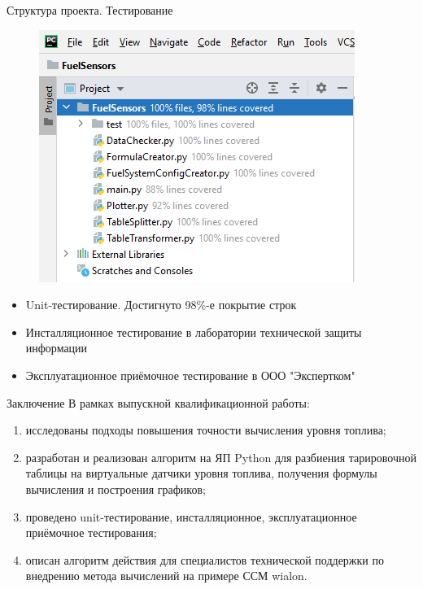 \documentclass[usenames,dvipsnames,11pt]{beamer}
\begin{document}
\begin{frame}{Структура проекта. Тестирование}
	
	\begin{minipage}[h]{0.39\linewidth}
		\begin{figure}
			\centering
			\includegraphics[width=1\linewidth]{graphics/screenshot001}
		\end{figure}
	\end{minipage}
	\hfill
	\begin{minipage}[h]{0.59\linewidth}
		\begin{itemize}
			\item Unit-тестирование. Достигнуто 98\%-е покрытие строк
			\item Инсталляционное тестирование в лаборатории технической защиты информации
			\item Эксплуатационное приёмочное тестирование в ООО "Экспертком"
		\end{itemize}
	\end{minipage}
	
\end{frame}	

\begin{frame}{Заключение}
	В рамках выпускной квалификационной работы:
	\begin{enumerate}
		\item исследованы подходы повышения точности вычисления уровня топлива;
		\item разработан и реализован алгоритм на ЯП Python для разбиения тарировочной таблицы на виртуальные датчики уровня топлива, получения формулы вычисления и построения графиков;
		\item проведено unit-тестирование, инсталляционное, эксплуатационное приёмочное тестирования;
		\item описан алгоритм действия для специалистов технической поддержки по внедрению метода вычислений на примере ССМ wialon.			
	\end{enumerate}
\end{frame}	
\end{document}
